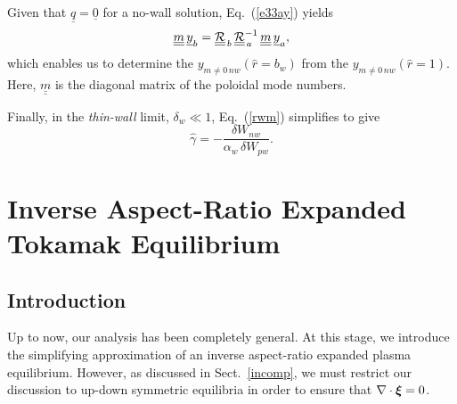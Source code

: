 \documentclass[12pt,prb,aps]{revtex4-1}
\newcommand {\bxi}{\mbox{\boldmath$\xi$}}
\begin{document}
 
 Given that $\underline{q}=\underline{0}$ for a no-wall solution, Eq.~(\ref{e33ay}) yields  
 \begin{equation}
\underline{\underline{m}}\, \underline{y}_b = \underline{\underline{\cal R}}_{\,b}\,\underline{\underline{\cal R}}_{\,a}^{-1}\,\underline{\underline{m}}\,\underline{y}_a,
\end{equation}
which enables us to determine the $y_{m\neq 0\,nw}(\hat{r}=b_w)$ from the $y_{m\neq 0\,nw}(\hat{r}=1)$. Here, $\underline{\underline{m}}$ is the diagonal matrix of the poloidal
mode numbers. 

Finally, in the {\em thin-wall}\/ limit, $\delta_w\ll 1$, Eq.~(\ref{rwm}) simplifies to give 
 \begin{equation}\label{rwm1}
 \hat{\gamma}= -\frac{\delta W_{nw}}{\alpha_w\,\delta W_{pw}}.
 \end{equation}

\section{Inverse Aspect-Ratio Expanded Tokamak Equilibrium}\label{large}

\subsection{Introduction}
Up to now, our analysis has been completely general. At this stage, we introduce the simplifying approximation of an  inverse aspect-ratio expanded plasma equilibrium. 
However, as discussed in Sect.~\ref{incomp}, we must restrict our discussion to up-down symmetric equilibria in order to ensure that $\nabla\cdot\bxi=0$. 
\end{document}
